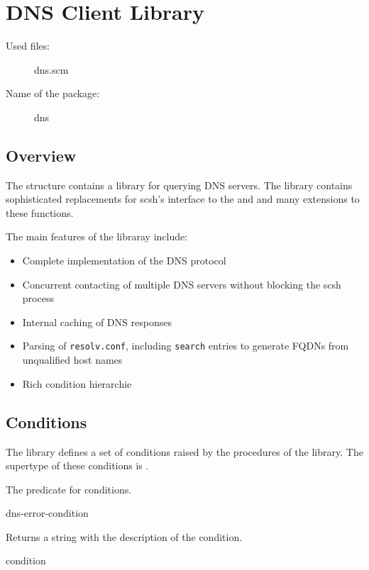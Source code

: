 \chapter{DNS Client Library}\label{cha:dns}
%
\begin{description}
\item[Used files:] dns.scm
\item[Name of the package:] dns
\end{description}
%
\section{Overview}
The  structure contains a library for querying DNS servers.
The library contains sophisticated replacements for scsh's interface
to the  and  and many extensions
to these functions.

The main features of the libraray include:
\begin{itemize}
\item Complete implementation of the DNS protocol
\item Concurrent contacting of multiple DNS servers without blocking
  the scsh process
\item Internal caching of DNS responses
\item Parsing of \texttt{resolv.conf}, including \texttt{search}
  entries to generate FQDNs from unqualified host names
\item Rich condition hierarchie
\end{itemize}

\section{Conditions}

The library defines a set of conditions raised by the procedures of
the library. The supertype of these conditions is .
\begin{desc}
  The predicate for  conditions.
\end{desc}
 {dns-error-condition} {\str}
\begin{desc}
  Returns a string with the description of the condition.
\end{desc}

 {condition}

